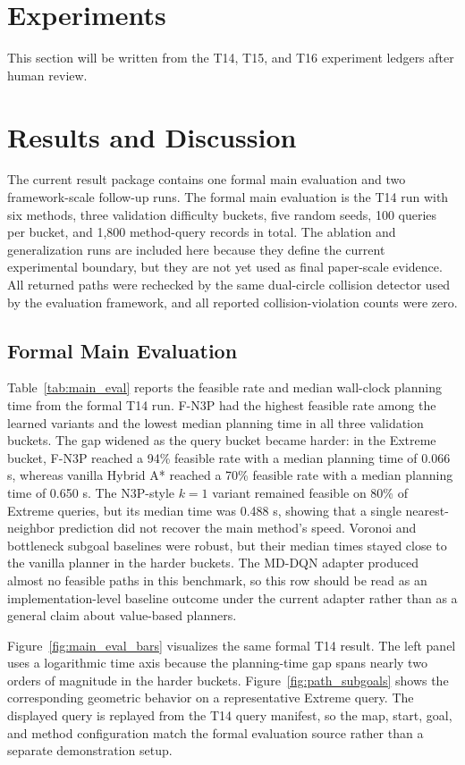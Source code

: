 \documentclass[11pt,a4paper]{article}
\begin{document}
\section{Experiments}
\label{sec:experiments}
This section will be written from the T14, T15, and T16 experiment ledgers after human review.

\section{Results and Discussion}
\label{sec:results}
The current result package contains one formal main evaluation and two framework-scale follow-up runs. The formal main evaluation is the T14 run with six methods, three validation difficulty buckets, five random seeds, 100 queries per bucket, and 1,800 method-query records in total. The ablation and generalization runs are included here because they define the current experimental boundary, but they are not yet used as final paper-scale evidence. All returned paths were rechecked by the same dual-circle collision detector used by the evaluation framework, and all reported collision-violation counts were zero.

\subsection{Formal Main Evaluation}
\label{sec:results_main}

Table~\ref{tab:main_eval} reports the feasible rate and median wall-clock planning time from the formal T14 run. F-N3P had the highest feasible rate among the learned variants and the lowest median planning time in all three validation buckets. The gap widened as the query bucket became harder: in the Extreme bucket, F-N3P reached a 94\% feasible rate with a median planning time of 0.066 s, whereas vanilla Hybrid A* reached a 70\% feasible rate with a median planning time of 0.650 s. The N3P-style $k=1$ variant remained feasible on 80\% of Extreme queries, but its median time was 0.488 s, showing that a single nearest-neighbor prediction did not recover the main method's speed. Voronoi and bottleneck subgoal baselines were robust, but their median times stayed close to the vanilla planner in the harder buckets. The MD-DQN adapter produced almost no feasible paths in this benchmark, so this row should be read as an implementation-level baseline outcome under the current adapter rather than as a general claim about value-based planners.

Figure~\ref{fig:main_eval_bars} visualizes the same formal T14 result. The left panel uses a logarithmic time axis because the planning-time gap spans nearly two orders of magnitude in the harder buckets. Figure~\ref{fig:path_subgoals} shows the corresponding geometric behavior on a representative Extreme query. The displayed query is replayed from the T14 query manifest, so the map, start, goal, and method configuration match the formal evaluation source rather than a separate demonstration setup.
\end{document}
